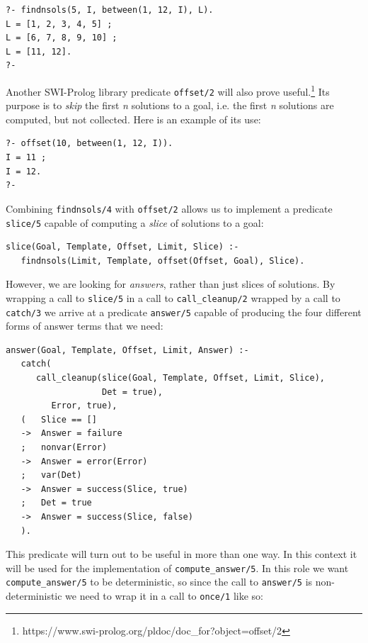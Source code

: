 \begin{verbatim}
?- findnsols(5, I, between(1, 12, I), L).
L = [1, 2, 3, 4, 5] ;
L = [6, 7, 8, 9, 10] ;
L = [11, 12].
?-
\end{verbatim}

\noindent Another SWI-Prolog library predicate \texttt{offset/2} will also prove useful.\footnote{https://www.swi-prolog.org/pldoc/doc\_for?object=offset/2} Its purpose is to \textit{skip} the first \textit{n} solutions to a goal, i.e. the first \textit{n} solutions are computed, but not collected. Here is an example of its use:

\begin{verbatim}
?- offset(10, between(1, 12, I)).
I = 11 ;
I = 12.
?- 
\end{verbatim}

\noindent Combining \texttt{findnsols/4} with \texttt{offset/2} allows us to implement a predicate \texttt{slice/5} capable of computing a \textit{slice} of solutions to a goal:

\begin{verbatim}
slice(Goal, Template, Offset, Limit, Slice) :-
   findnsols(Limit, Template, offset(Offset, Goal), Slice).
\end{verbatim}

\noindent However, we are looking for \textit{answers}, rather than just slices of solutions. By wrapping a call to \texttt{slice/5} in a call to \texttt{call\_cleanup/2} wrapped by a call to \texttt{catch/3} we arrive at a predicate \texttt{answer/5} capable of producing the four different forms of answer terms that we need:

\begin{verbatim}
answer(Goal, Template, Offset, Limit, Answer) :-
   catch(
      call_cleanup(slice(Goal, Template, Offset, Limit, Slice),
                   Det = true),
         Error, true),
   (   Slice == []
   ->  Answer = failure
   ;   nonvar(Error)
   ->  Answer = error(Error)
   ;   var(Det)
   ->  Answer = success(Slice, true)
   ;   Det = true
   ->  Answer = success(Slice, false)
   ).
\end{verbatim}

\noindent This predicate will turn out to be useful in more than one way. In this context it will be used for the implementation of \texttt{compute\_answer/5}. In this role we want \texttt{compute\_answer/5} to be deterministic, so since the call to \texttt{answer/5} is non-deterministic we need to wrap it in a call to \texttt{once/1} like so:

